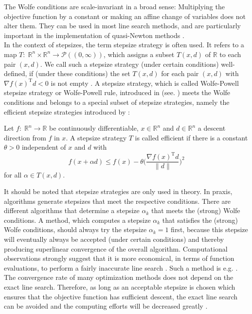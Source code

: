 The Wolfe conditions are scale-invariant in a broad sense: Multiplying the objective function by a constant or making an affine change of variables does not alter them. They can be used in most line search methods, and are particularly important in the implementation of quasi-Newton methods \cite[p.~33-35]{NocedalWright:2006}. \\

In the context of stepsizes, the term stepsize strategy is often used. It refers to a map $T \colon \; \mathbb{R}^n \times \mathbb{R}^n \to \mathcal{P} ((0,\infty))$, which assigns a subset $T(x, d)$ of $\mathbb{R}$ to each pair $(x, d)$. We call such a stepsize strategy (under certain conditions) well-defined, if (under these conditions) the set $T(x, d)$ for each pair $(x,d)$ with $\nabla f(x)^{\mathrm{T}}d < 0$ is not empty {\cite[p.~27]{GeigerKanzow:1999}}. A stepsize strategy, which is called Wolfe-Powell stepsize strategy or Wolfe-Powell rule, introduced in \cite{Powell:1975} (see. \cite[Definition~2.2.]{Werner:1978}) meets the Wolfe conditions and belongs to a special subset of stepsize strategies, namely the efficient stepsize strategies introduced by \cite[Definition~0.1]{WarthWerner:1977}: 

\begin{definition}\label{EfficientStepSize}
    Let $f \colon \; \mathbb{R}^n \to \mathbb{R}$ be continuously differentiable, $x \in \mathbb{R}^n$ and $d \in \mathbb{R}^n$ a descent direction from $f$ in $x$. A stepsize strategy $T$ is called efficient if there is a constant $\theta > 0$ independent of $x$ and $d$ with 
    \begin{equation*}
        f(x + \alpha d) \leq f(x) - \theta \bigg( \frac{\nabla f(x)^{\mathrm{T}}d}{\lVert d \rVert} \bigg)^2
    \end{equation*}
    for all $\alpha \in T(x,d)$.
\end{definition}

It should be noted that stepsize strategies are only used in theory. In praxis, algorithms generate stepsizes that meet the respective conditions. There are different algorithms that determine a stepsize $\alpha_k$ that meets the (strong) Wolfe conditions. A method, which computes a stepsize $\alpha_k$ that satisfies the (strong) Wolfe conditions, should always try the stepsize $\alpha_k = 1$ first, because this stepsize will eventually always be accepted (under certain conditions) and thereby producing superlinear convergence of the overall algorithm. Computational observations strongly suggest that it is more economical, in terms of function evaluations, to perform a fairly inaccurate line search \cite[p.~142]{NocedalWright:2006}. Such a method is e.g. \cite[Algorithmus~9.3]{UlbrichUlbrich:2012}. \\
The convergence rate of many optimization methods does not depend on the exact line search. Therefore, as long as an acceptable stepsize is chosen which ensures that the objective function has sufficient descent, the exact line search can be avoided and the computing efforts will be decreased greatly \cite[p.~102]{SunYuan:2006}. \\

